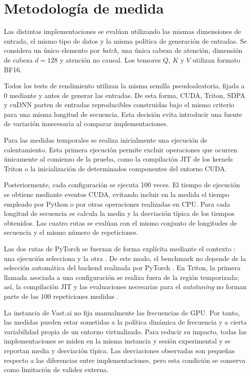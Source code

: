 \section{Metodología de medida}

Las distintas implementaciones se evalúan utilizando las mismas dimensiones de entrada, el mismo tipo de datos y la misma política de generación de entradas. Se considera un único elemento por \textit{batch}, una única cabeza de atención, dimensión de cabeza \(d=128\) y atención no causal. Los tensores \(Q\), \(K\) y \(V\) utilizan formato BF16.

Todos los tests de rendimiento utilizan la misma semilla pseudoaleatoria, fijada a 0 mediante  y  antes de generar las entradas. De esta forma, CUDA, Triton, SDPA y cuDNN parten de entradas reproducibles construidas bajo el mismo criterio para una misma longitud de secuencia. Esta decisión evita introducir una fuente de variación innecesaria al comparar implementaciones.

Para las medidas temporales se realiza inicialmente una ejecución de calentamiento. Esta primera ejecución permite excluir operaciones que ocurren únicamente al comienzo de la prueba, como la compilación JIT de los kernels Triton o la inicialización de determinados componentes del entorno CUDA.

Posteriormente, cada configuración se ejecuta 100 veces. El tiempo de ejecución se obtiene mediante eventos CUDA, evitando incluir en la medida el tiempo empleado por Python o por otras operaciones realizadas en CPU. Para cada longitud de secuencia se calcula la media y la desviación típica de los tiempos obtenidos. Las cuatro rutas se evalúan con el mismo conjunto de longitudes de secuencia y el mismo número de repeticiones.

Las dos rutas de PyTorch se fuerzan de forma explícita mediante el contexto : una ejecución selecciona  y la otra . De este modo, el benchmark no depende de la selección automática del backend realizada por PyTorch \cite{pytorchSDPA}. En Triton, la primera llamada asociada a una configuración se realiza fuera de la región temporizada; así, la compilación JIT y las evaluaciones necesarias para el \textit{autotuning} no forman parte de las 100 repeticiones medidas \cite{tritonAutotune}.

La instancia de Vast.ai no fija manualmente las frecuencias de GPU. Por tanto, las medidas pueden estar sometidas a la política dinámica de frecuencia y a cierta variabilidad propia de un entorno virtualizado. Para reducir su impacto, todas las implementaciones se miden en la misma instancia y sesión experimental y se reportan media y desviación típica. Las desviaciones observadas son pequeñas respecto a las diferencias entre implementaciones, pero esta condición se conserva como limitación de validez externa.

